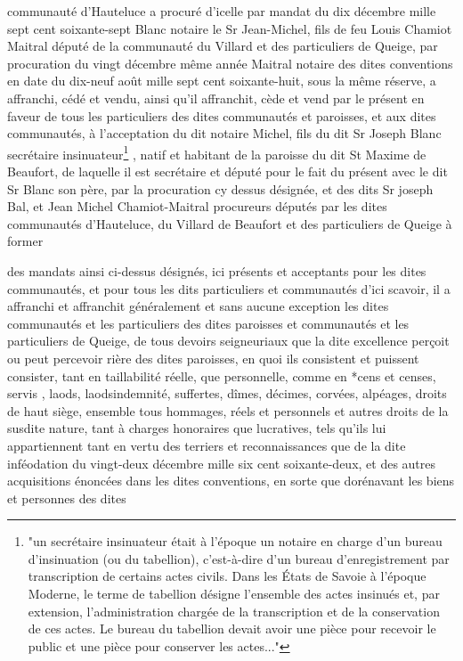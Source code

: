 \documentclass[a4paper,twoside,openany]{article}
\begin{document}
communauté d’Hauteluce a procuré d’icelle
par mandat du dix décembre mille sept cent 
soixante-sept Blanc notaire le Sr Jean-Michel, fils de 
feu Louis Chamiot Maitral  député de la 
communauté du Villard et des particuliers de 
Queige, par procuration du vingt décembre même 
année Maitral notaire  des dites conventions en date du 
dix-neuf août mille sept cent soixante-huit, 
sous la même réserve, a affranchi, cédé et vendu, 
ainsi qu’il affranchit, cède et vend par le présent 
en faveur de tous les particuliers des dites communautés 
et paroisses, et aux dites communautés, à l’acceptation 
du dit notaire Michel, fils du dit Sr Joseph Blanc
secrétaire insinuateur\footnote{"un secrétaire insinuateur était à l'époque un notaire en charge d'un bureau d'insinuation (ou du tabellion), c'est-à-dire d'un bureau d'enregistrement par transcription de certains actes civils. Dans les États de Savoie à l'époque Moderne, le terme de tabellion désigne l'ensemble des actes insinués et, par extension, l'administration chargée de la transcription et de la conservation de ces actes. Le bureau du tabellion devait avoir une pièce pour recevoir le public et une pièce pour conserver les actes..."} , natif et habitant de la 
paroisse du dit St Maxime de Beaufort, de laquelle 
il est secrétaire et député pour le fait du présent
avec le dit Sr Blanc son père, par la procuration 
cy dessus désignée, et des dits Sr joseph Bal, et
Jean Michel Chamiot-Maitral procureurs députés 
par les dites communautés d’Hauteluce, du Villard 
de Beaufort et des particuliers de Queige à former



des mandats ainsi ci-dessus désignés, ici présents
et acceptants pour les dites communautés, et pour tous
 les dits particuliers et communautés d’ici scavoir,
 il a affranchi et affranchit généralement et
sans aucune exception les dites communautés et les 
particuliers des dites paroisses et communautés et les
particuliers de Queige, de tous devoirs 
seigneuriaux que la dite excellence perçoit ou peut
percevoir \gls{rière} des dites paroisses, en quoi ils consistent
et puissent consister, tant en taillabilité réelle, que
personnelle, comme en *\gls{cens} et censes, \gls{servis} , \gls{laods}, 
\gls{laodsindemnité}, \gls{suffertes}, \gls{dîmes}, \gls{décimes}, 
\gls{corvées}, \gls{alpéages}, \gls{droits de haut siège}, ensemble 
tous hommages, réels et personnels et autres droits 
de la susdite nature, tant à charges honoraires que 
lucratives, tels qu’ils lui appartiennent tant en 
vertu des terriers et reconnaissances que de la dite 
inféodation du vingt-deux décembre mille six 
cent soixante-deux, et des autres acquisitions 
énoncées dans les dites conventions, en sorte que 
dorénavant les biens et personnes des dites
\end{document}
